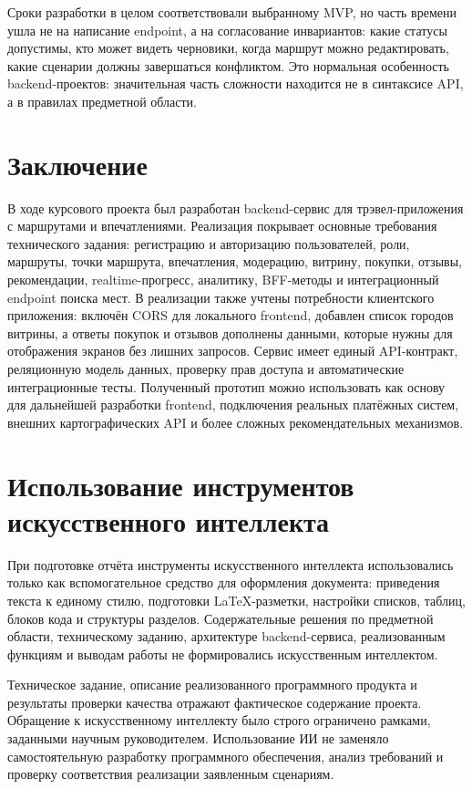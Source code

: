 \documentclass[a4paper,12pt]{extarticle}
\begin{document}
Сроки разработки в целом соответствовали выбранному MVP, но часть времени ушла не на написание endpoint, а на согласование инвариантов: какие статусы допустимы, кто может видеть черновики, когда маршрут можно редактировать, какие сценарии должны завершаться конфликтом. Это нормальная особенность backend-проектов: значительная часть сложности находится не в синтаксисе API, а в правилах предметной области.

\section{Заключение}

В ходе курсового проекта был разработан backend-сервис для трэвел-приложения с маршрутами и впечатлениями. Реализация покрывает основные требования технического задания: регистрацию и авторизацию пользователей, роли, маршруты, точки маршрута, впечатления, модерацию, витрину, покупки, отзывы, рекомендации, realtime-прогресс, аналитику, BFF-методы и интеграционный endpoint поиска мест. В реализации также учтены потребности клиентского приложения: включён CORS для локального frontend, добавлен список городов витрины, а ответы покупок и отзывов дополнены данными, которые нужны для отображения экранов без лишних запросов. Сервис имеет единый API-контракт, реляционную модель данных, проверку прав доступа и автоматические интеграционные тесты. Полученный прототип можно использовать как основу для дальнейшей разработки frontend, подключения реальных платёжных систем, внешних картографических API и более сложных рекомендательных механизмов.

\section{Использование инструментов искусственного интеллекта}

При подготовке отчёта инструменты искусственного интеллекта использовались только как вспомогательное средство для оформления документа: приведения текста к единому стилю, подготовки LaTeX-разметки, настройки списков, таблиц, блоков кода и структуры разделов. Содержательные решения по предметной области, техническому заданию, архитектуре backend-сервиса, реализованным функциям и выводам работы не формировались искусственным интеллектом.

Техническое задание, описание реализованного программного продукта и результаты проверки качества отражают фактическое содержание проекта. Обращение к искусственному интеллекту было строго ограничено рамками, заданными научным руководителем. Использование ИИ не заменяло самостоятельную разработку программного обеспечения, анализ требований и проверку соответствия реализации заявленным сценариям.
\end{document}
